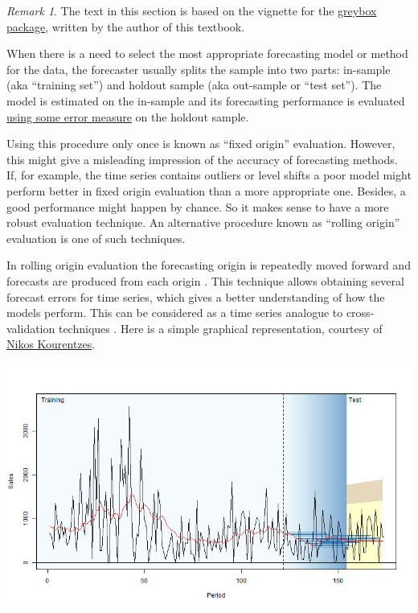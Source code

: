 \documentclass[
]{book}
\theoremstyle{definition}
\theoremstyle{definition}
\theoremstyle{definition}
\theoremstyle{definition}
\theoremstyle{remark}
\newtheorem*{remark}{Remark}
\begin{document}
\begin{remark}
The text in this section is based on the vignette for the \href{https://cran.r-project.org/package=greybox}{greybox package}, written by the author of this textbook.
\end{remark}

When there is a need to select the most appropriate forecasting model or method for the data, the forecaster usually splits the sample into two parts: in-sample (aka ``training set'') and holdout sample (aka out-sample or ``test set''). The model is estimated on the in-sample and its forecasting performance is evaluated \protect\hyperlink{errorMeasures}{using some error measure} on the holdout sample.

Using this procedure only once is known as ``fixed origin'' evaluation. However, this might give a misleading impression of the accuracy of forecasting methods. If, for example, the time series contains outliers or level shifts a poor model might perform better in fixed origin evaluation than a more appropriate one. Besides, a good performance might happen by chance. So it makes sense to have a more robust evaluation technique. An alternative procedure known as ``rolling origin'' evaluation is one of such techniques.

In rolling origin evaluation the forecasting origin is repeatedly moved forward and forecasts are produced from each origin \citep{Tashman2000}. This technique allows obtaining several forecast errors for time series, which gives a better understanding of how the models perform. This can be considered as a time series analogue to cross-validation techniques \citep{WikipediaCrossValidation2020}. Here is a simple graphical representation, courtesy of \href{https://kourentzes.com/forecasting/}{Nikos Kourentzes}.

\includegraphics{./images/03-ROAnimation.jpg}
\end{document}
